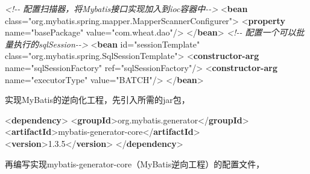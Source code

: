 \documentclass[
]{article}
\newenvironment{Shaded}{}{}
\newcommand{\CommentTok}[1]{\textcolor[rgb]{0.38,0.63,0.69}{\textit{#1}}}
\newcommand{\KeywordTok}[1]{\textcolor[rgb]{0.00,0.44,0.13}{\textbf{#1}}}
\newcommand{\NormalTok}[1]{#1}
\newcommand{\OtherTok}[1]{\textcolor[rgb]{0.00,0.44,0.13}{#1}}
\newcommand{\StringTok}[1]{\textcolor[rgb]{0.25,0.44,0.63}{#1}}
\begin{document}
\begin{Shaded}
\begin{Highlighting}[]
    \CommentTok{\textless{}!{-}{-}    配置扫描器，将Mybatis接口实现加入到ioc容器中{-}{-}\textgreater{}}
\NormalTok{    \textless{}}\KeywordTok{bean}\OtherTok{ class=}\StringTok{"org.mybatis.spring.mapper.MapperScannerConfigurer"}\NormalTok{\textgreater{}}
\NormalTok{        \textless{}}\KeywordTok{property}\OtherTok{ name=}\StringTok{"basePackage"}\OtherTok{ value=}\StringTok{"com.wheat.dao"}\NormalTok{/\textgreater{}}
\NormalTok{    \textless{}/}\KeywordTok{bean}\NormalTok{\textgreater{}}
    \CommentTok{\textless{}!{-}{-}    配置一个可以批量执行的sqlSession{-}{-}\textgreater{}}
\NormalTok{    \textless{}}\KeywordTok{bean}\OtherTok{ id=}\StringTok{"sessionTemplate"}\OtherTok{ class=}\StringTok{"org.mybatis.spring.SqlSessionTemplate"}\NormalTok{\textgreater{}}
\NormalTok{        \textless{}}\KeywordTok{constructor{-}arg}\OtherTok{ name=}\StringTok{"sqlSessionFactory"}\OtherTok{ ref=}\StringTok{"sqlSessionFactory"}\NormalTok{/\textgreater{}}
\NormalTok{        \textless{}}\KeywordTok{constructor{-}arg}\OtherTok{ name=}\StringTok{"executorType"}\OtherTok{ value=}\StringTok{"BATCH"}\NormalTok{/\textgreater{}}
\NormalTok{    \textless{}/}\KeywordTok{bean}\NormalTok{\textgreater{}}
\end{Highlighting}
\end{Shaded}

实现MyBatis的逆向化工程，先引入所需的jar包，

\begin{Shaded}
\begin{Highlighting}[]
\NormalTok{\textless{}}\KeywordTok{dependency}\NormalTok{\textgreater{}}
\NormalTok{            \textless{}}\KeywordTok{groupId}\NormalTok{\textgreater{}org.mybatis.generator\textless{}/}\KeywordTok{groupId}\NormalTok{\textgreater{}}
\NormalTok{            \textless{}}\KeywordTok{artifactId}\NormalTok{\textgreater{}mybatis{-}generator{-}core\textless{}/}\KeywordTok{artifactId}\NormalTok{\textgreater{}}
\NormalTok{            \textless{}}\KeywordTok{version}\NormalTok{\textgreater{}1.3.5\textless{}/}\KeywordTok{version}\NormalTok{\textgreater{}}
\NormalTok{        \textless{}/}\KeywordTok{dependency}\NormalTok{\textgreater{}}
\end{Highlighting}
\end{Shaded}

再编写实现mybatis-generator-core（MyBatis逆向工程）的配置文件，
\end{document}
